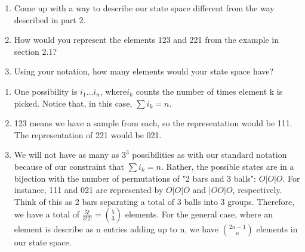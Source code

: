 \begin{Exercise}
\begin{enumerate}[label=(\alph*)]
\item Come up with a way to describe our state space different from the way described in part 2.
\item How would you represent the elements 123 and 221 from the example in section 2.1?
\item Using your notation, how many elements would your state space have? 
\end{enumerate}
\end{Exercise}
\begin{Answer}
\begin{enumerate}[label=(\alph*)]
\item One possibility is $i_1 ... i_n$, where$ i_k$ counts the number of times element k is picked. Notice that, in this case, $\sum i_k = n$. 
\item 123 means we have a sample from each, so the representation would be 111. The representation of 221 would be 021.
\item We will not have as many as $3^3$ possibilities as with our standard notation because of our constraint that $\sum i_k = n$. Rather, the possible states are in a bijection with the number of permutations of "2 bars and 3 balls": $O|O|O$. 
For instance, 111 and 021 are represented by $O|O|O$ and $|OO|O$, respectively. Think of this as 2 bars separating a total of 3 balls into 3 groups. 
Therefore, we have a total of $\frac{5!}{3!2!} = \binom{5}{3}$ elements.
For the general case, where an element is describe as n entries adding up to n, we have $\binom{2n-1}{n}$ elements in our state space.
\end{enumerate}
\end{Answer}

